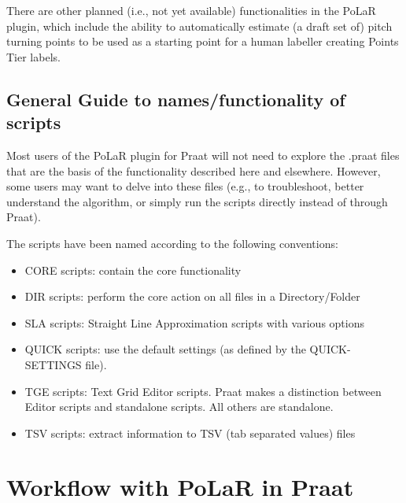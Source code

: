\documentclass[11pt, twoside]{memoir}
\begin{document}
There are other planned (i.e., not yet available) functionalities in the PoLaR plugin, which include the ability to automatically estimate (a draft set of) pitch turning points to be used as a starting point for a human labeller creating Points Tier labels. 

\subsection{General Guide to names/functionality of scripts}
Most users of the PoLaR plugin for Praat will not need to explore the .praat files that are the basis of the functionality described here and elsewhere. However, some users may want to delve into these files (e.g., to troubleshoot, better understand the algorithm, or simply run the scripts directly instead of through Praat).

The scripts have been named according to the following conventions:

\begin{itemize}
	\item CORE scripts: contain the core functionality 
	\item DIR scripts: perform the core action on all files in a Directory\slash Folder
	\item SLA scripts: Straight Line Approximation scripts with various options
	\item QUICK scripts: use the default settings (as defined by the QUICK-SETTINGS file).
	\item TGE scripts: Text Grid Editor scripts. Praat makes a distinction between Editor scripts and standalone scripts. All others are standalone. 
	\item TSV scripts: extract information to TSV (tab separated values) files
\end{itemize}


\section{Workflow with PoLaR in Praat}\label{sec:workflow-with-polar-in-praat}
\end{document}
